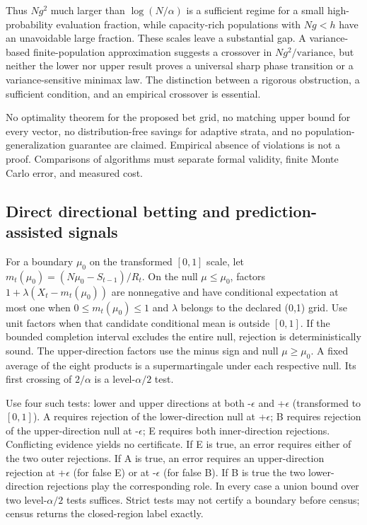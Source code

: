 Thus \(Ng^2\) much larger than \(\log(N/\alpha)\) is a sufficient regime for a small high-probability evaluation fraction, while capacity-rich populations with \(Ng<h\) have an unavoidable large fraction. These scales leave a substantial gap. A variance-based finite-population approximation suggests a crossover in \(Ng^2/\mathrm{variance}\), but neither the lower nor upper result proves a universal sharp phase transition or a variance-sensitive minimax law. The distinction between a rigorous obstruction, a sufficient condition, and an empirical crossover is essential.

No optimality theorem for the proposed bet grid, no matching upper bound for every vector, no distribution-free savings for adaptive strata, and no population-generalization guarantee are claimed. Empirical absence of violations is not a proof. Comparisons of algorithms must separate formal validity, finite Monte Carlo error, and measured cost.

\subsection{Direct directional betting and prediction-assisted signals}\label{theory:8}

For a boundary \(\mu_0\) on the transformed \([0,1]\) scale, let \(m_t(\mu_0)=(N\mu_0-S_{t-1})/R_t\). On the null \(\mu\le\mu_0\), factors \(1+\lambda(X_t-m_t(\mu_0))\) are nonnegative and have conditional expectation at most one when \(0\le m_t(\mu_0)\le1\) and \(\lambda\) belongs to the declared (0,1) grid. Use unit factors when that candidate conditional mean is outside \([0,1]\). If the bounded completion interval excludes the entire null, rejection is deterministically sound. The upper-direction factors use the minus sign and null \(\mu\ge\mu_0\). A fixed average of the eight products is a supermartingale under each respective null. Its first crossing of \(2/\alpha\) is a level-\(\alpha/2\) test.

Use four such tests: lower and upper directions at both -\(\epsilon\) and +\(\epsilon\) (transformed to \([0,1]\)). A requires rejection of the lower-direction null at +\(\epsilon\); B requires rejection of the upper-direction null at -\(\epsilon\); E requires both inner-direction rejections. Conflicting evidence yields no certificate. If E is true, an error requires either of the two outer rejections. If A is true, an error requires an upper-direction rejection at +\(\epsilon\) (for false E) or at -\(\epsilon\) (for false B). If B is true the two lower-direction rejections play the corresponding role. In every case a union bound over two level-\(\alpha/2\) tests suffices. Strict tests may not certify a boundary before census; census returns the closed-region label exactly.

